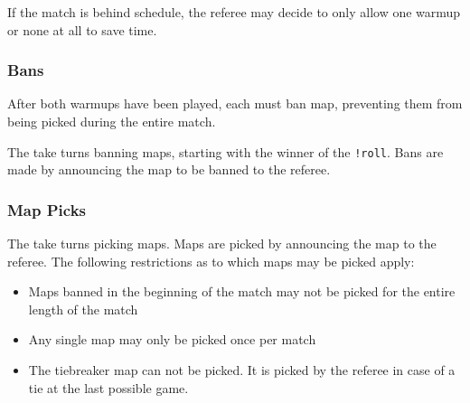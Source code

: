 If the match is behind schedule, the referee may decide to only allow one warmup or none at all to save time.


\subsubsection{Bans}
After both warmups have been played, each  must ban \bans map, preventing them from being picked during the entire match.

The  take turns banning maps, starting with the winner of the \texttt{!roll}. Bans are made by announcing the map to be banned to the referee.


\subsubsection{Map Picks}
The  take turns picking maps. Maps are picked by announcing the map to the referee. The following restrictions as to which maps may be picked apply:

\begin{samepage}
\begin{itemize}
	\item Maps banned in the beginning of the match may not be picked for the entire length of the match
	\item Any single map may only be picked once per match
	\item The tiebreaker map can not be picked. It is picked by the referee in case of a tie at the last possible game.
	\custompick
\end{itemize}
\end{samepage}

